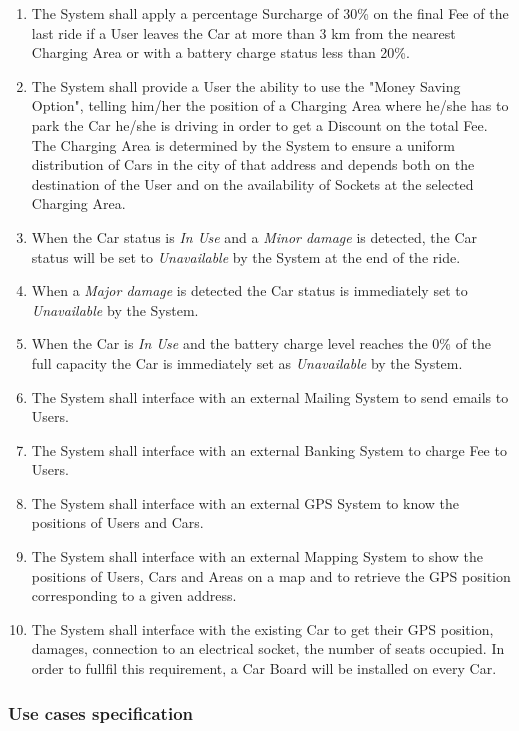 \begin{enumerate}[label=\textbf{R\arabic*}]
	\item The System shall apply a percentage Surcharge of 30\% on the final Fee of the last ride if a User leaves the Car at more than 3 km from the nearest Charging Area or with a battery charge status less than 20\%.
	\item The System shall provide a User the ability to use the "Money Saving Option", telling him/her the position of a Charging Area where he/she has to park the Car he/she is driving in order to get a Discount on the total Fee. The Charging Area is determined by the System to ensure a uniform distribution of Cars in the city of that address and depends both on the destination of the User and on the availability of Sockets at the selected Charging Area.
	\item When the Car status is \textit{In Use} and a \textit{Minor damage} is detected, the Car status will be set to \textit{Unavailable} by the System at the end of the ride. 
	\item When a \textit{Major damage} is detected the Car status is immediately set to \textit{Unavailable} by the System.
	\item When the Car is \textit{In Use} and the battery charge level reaches the 0\% of the full capacity the Car is immediately set as \textit{Unavailable} by the System.	
	\item The System shall interface with an external Mailing System to send emails to Users.
	\item The System shall interface with an external Banking System to charge Fee to Users.
	\item The System shall interface with an external GPS System to know the positions of Users and Cars.
	\item The System shall interface with an external Mapping System to show the positions of Users, Cars and Areas on a map and to retrieve the GPS position corresponding to a given address.
	\item The System shall interface with the existing Car to get their GPS position, damages, connection to an electrical socket, the number of seats occupied. In order to fullfil this requirement, a Car Board will be installed on every Car.
\end{enumerate}

\subsubsection{Use cases specification}


